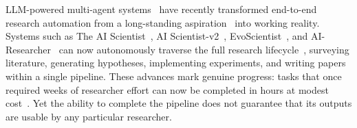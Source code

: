 \documentclass{opendatalab}
\begin{document}

LLM-powered multi-agent systems~\cite{achiam2023gpt} have recently transformed end-to-end research automation from a long-standing aspiration~\cite{langley1987scientific, waltz2009automating} into working reality. Systems such as The AI Scientist~\cite{lu2024ai}, AI Scientist-v2~\cite{yamada2025ai}, EvoScientist~\cite{lyu2026evoscientist}, and AI-Researcher~\cite{tang2025ai} can now autonomously traverse the full research lifecycle~\cite{weng2025deepscientist, shao2025omniscientist, li2026autosota}, surveying literature, generating hypotheses, implementing experiments, and writing papers within a single pipeline. These advances mark genuine progress: tasks that once required weeks of researcher effort can now be completed in hours at modest cost~\cite{zhu2025ai}. Yet the ability to complete the pipeline does not guarantee that its outputs are usable by any particular researcher.
\end{document}
